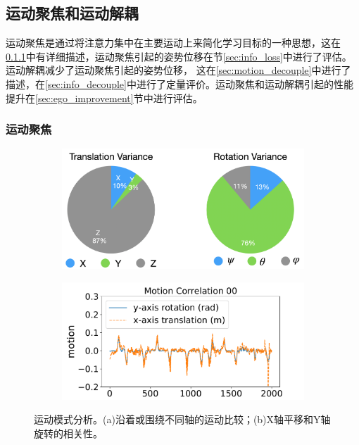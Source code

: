 \subsection{运动聚焦和运动解耦}
\label{sec:motion}
运动聚焦是通过将注意力集中在主要运动上来简化学习目标的一种思想，这在\ref{sec:motion_focus}中有详细描述，运动聚焦引起的姿势位移在节\ref{sec:info_loss}中进行了评估。运动解耦减少了运动聚焦引起的姿势位移，
这在\ref{sec:motion_decouple}中进行了描述，在\ref{sec:info_decouple}中进行了定量评价。运动聚焦和运动解耦引起的性能提升在\ref{sec:ego_improvement}节中进行评估。
\subsubsection{运动聚焦}
\label{sec:motion_focus}
\begin{figure}[ht]
    \centering
    \begin{subfigure}[b]{0.65\textwidth}
        \includegraphics[width=\textwidth]{datavo/motion_dis.png}
        \caption{}
        \label{fig:motion_dis} 
        \vspace{4pt}
    \end{subfigure}
    \begin{subfigure}[b]{0.65\textwidth}
        \includegraphics[width=\textwidth]{datavo/rotation_corr.pdf}
        \caption{}
        \label{fig:rotation_corr}
    \end{subfigure}
        \caption{运动模式分析。(a)沿着或围绕不同轴的运动比较；(b)X轴平移和Y轴旋转的相关性。}
\end{figure}

